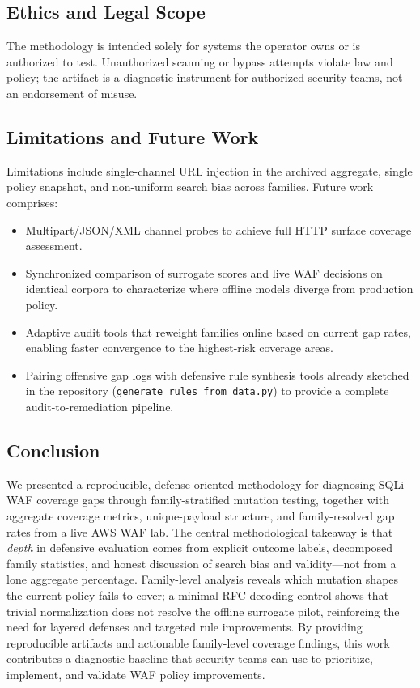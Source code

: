 \subsection{Ethics and Legal Scope}
The methodology is intended solely for systems the operator owns or is authorized to test. Unauthorized scanning or bypass attempts violate law and policy; the artifact is a diagnostic instrument for authorized security teams, not an endorsement of misuse.

\subsection{Limitations and Future Work}
Limitations include single-channel URL injection in the archived aggregate, single policy snapshot, and non-uniform search bias across families. Future work comprises:
\begin{itemize}
  \item Multipart/JSON/XML channel probes to achieve full HTTP surface coverage assessment.
  \item Synchronized comparison of surrogate scores and live WAF decisions on identical corpora to characterize where offline models diverge from production policy.
  \item Adaptive audit tools that reweight families online based on current gap rates, enabling faster convergence to the highest-risk coverage areas.
  \item Pairing offensive gap logs with defensive rule synthesis tools already sketched in the repository (\texttt{generate\_rules\_from\_data.py}) to provide a complete audit-to-remediation pipeline.
\end{itemize}

\subsection{Conclusion}
We presented a reproducible, defense-oriented methodology for diagnosing SQLi WAF coverage gaps through family-stratified mutation testing, together with aggregate coverage metrics, unique-payload structure, and family-resolved gap rates from a live AWS WAF lab. The central methodological takeaway is that \emph{depth} in defensive evaluation comes from explicit outcome labels, decomposed family statistics, and honest discussion of search bias and validity---not from a lone aggregate percentage. Family-level analysis reveals which mutation shapes the current policy fails to cover; a minimal RFC decoding control shows that trivial normalization does not resolve the offline surrogate pilot, reinforcing the need for layered defenses and targeted rule improvements. By providing reproducible artifacts and actionable family-level coverage findings, this work contributes a diagnostic baseline that security teams can use to prioritize, implement, and validate WAF policy improvements.
